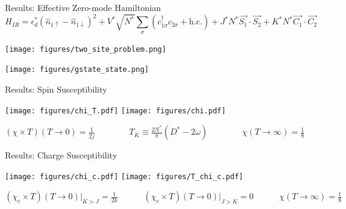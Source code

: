 \documentclass[aspectratio=169]{beamer}
\begin{document}
\begin{frame}{Results: Effective Zero-mode Hamiltonian}
	\vspace*{-30pt}
	\[H_{IR} = \epsilon_d^* \left( \hat n_{1 \uparrow} - \hat n_{1 \downarrow} \right) ^2 + V^*\sqrt{N^*}\sum_{\sigma}\left(c^\dagger_{1\sigma}c_{2\sigma} + \text{h.c.} \right) + J^*N^*\vec{S_1}\cdot\vec{S_2} + K^*N^*\vec{C_1}\cdot\vec{C_2}\]
\hspace*{-15pt}
	\begin{minipage}{0.5\textwidth}
	{\centering
	\texttt{[image: figures/two\_site\_problem.png]}}
\end{minipage}
\hspace*{25pt}
\begin{minipage}{0.45\textwidth}
	{\centering
	\texttt{[image: figures/gstate\_state.png]}}
\end{minipage}
\end{frame}

\begin{frame}{Results: Spin Susceptibility}
\begin{center}
	\hspace*{-20pt}
	\texttt{[image: figures/chi\_T.pdf]}
	\hspace*{25pt}
	\texttt{[image: figures/chi.pdf]}
\end{center}
\hspace*{20pt}\large{\(
\left(\chi\times T\right)\left( T \to 0 \right) = \frac{1}{2j} \quad\quad \quad \quad T_K \equiv \frac{2N^*}{\pi}\left(D^* - 2\omega\right)\quad\quad \quad \quad \chi \left( T \to \infty \right) = \frac{1}{8}\)}

\end{frame}

\begin{frame}{Results: Charge Susceptibility}
\begin{center}
	\hspace*{-20pt}
	\texttt{[image: figures/chi\_c.pdf]}
	\hspace*{25pt}
	\texttt{[image: figures/T\_chi\_c.pdf]}
\end{center}
\large{\(
\left(\chi_c\times T\right)\left(T \to 0\right)\bigg\vert_{K>J} = \frac{1}{2k} \quad\quad\quad \left(\chi_c\times T\right)\left(T \to 0\right)\bigg\vert_{J>K} = 0 \quad\quad\quad \chi \left( T \to \infty \right) = \frac{1}{8}\)}
\end{frame}
\end{document}
